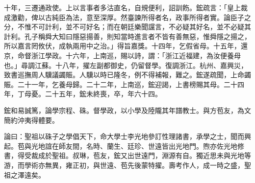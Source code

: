 \begin{pinyinscope}
十年，三遷通政使。上以言事者多沽直名，自規便利，詔訓飭。鋐疏言：「皇上裁成激勸，俾以古純臣為法，意至深厚。然臺諫所得者名，政事所得者實。論臣子之分，不惟不可計利，並不可好名；而在朝廷樂聞讜言，不必疑其好名，並不必疑其計利。孔子稱舜大知曰隱惡揚善，則知當時進言者不皆有善無惡，惟舜隱之揚之，所以嘉言罔攸伏，成執兩用中之治。」得旨嘉獎。十四年，乞假省母。十五年，還京，命督浙江學政。十六年，上南巡，賜以詩，謂：「浙江近福建，為汝便養母也。」尋調江蘇。十八年，擢左副都御史，仍留督學。復調浙江。杭州、嘉興災，致書巡撫周人驥議蠲賑。人驥以時已隆冬，例不得補報，難之。鋐遂疏聞，上命蠲賑。二十一年，乞養母歸。二十二年，上南巡，鋐迎謁，上書榜賜其母。二十四年，丁母憂。二十五年，鋐未終喪，卒，年六十四。

鋐和易誠篤，論學宗程、硃。督學政，以小學及陸隴其年譜教士。與方苞友，為文簡約沖夷得體要。

論曰：聖祖以硃子之學倡天下，命大學士李光地參訂性理諸書，承學之士，聞而興起。苞與光地誼在師友間，名時、蘭生、廷珍、世遠皆出光地門。煦亦佐光地修書，得受裁成於聖祖。叔琳，苞友，鋐又出世遠門，淵源有自。獨近思未與光地等游，而學術亦無異，雍正初，與世遠、苞先後蒙特擢。壽考作人，成一時之盛，聖祖之澤遠矣。


\end{pinyinscope}